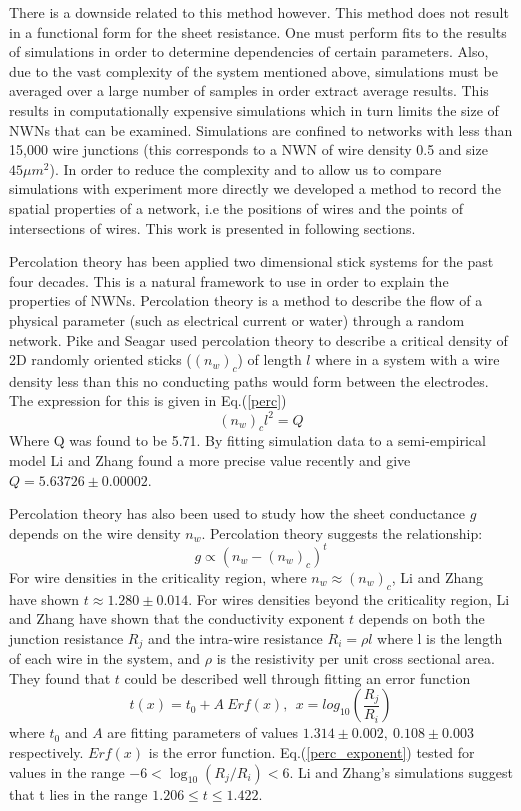 There is a downside related to this method however. This method does not result in a functional form for the sheet resistance. One must perform fits to the results of simulations in order to determine dependencies of certain parameters. Also, due to the vast complexity of the system mentioned above, simulations must be averaged over a large number of samples in order extract average results. This results in computationally expensive simulations which in turn limits the size of NWNs that can be examined. Simulations are confined to networks with less than 15,000 wire junctions (this corresponds to a NWN of wire density 0.5 and size $45 \mu m^2$). In order to reduce the complexity and to allow us to compare simulations with experiment more directly we developed a method to record the spatial properties of a network\cite{rocha2015}, i.e the positions of wires and the points of intersections of wires. This work is presented in following sections.  

Percolation theory has been applied two dimensional stick systems for the past four decades. This is a natural framework to use in order to explain the properties of NWNs. Percolation theory is a method to describe the flow of a physical parameter (such as electrical current or water) through a random network. Pike and Seagar used percolation theory to describe a critical density of 2D randomly oriented sticks ($(n_w)_c$) of length $l$ where in a system with a wire density less than this no conducting paths would form between the electrodes\cite{pike1974}. The expression for this is given in Eq.(\ref{perc})
\begin{equation}
(n_w)_c l^2 = Q
\label{perc}
\end{equation}
Where Q was found to be 5.71. By fitting simulation data to a semi-empirical model Li and Zhang found a more precise value recently and give $Q = 5.63726 \pm 0.00002$\cite{li2009}.

Percolation theory has also been used to study how the sheet conductance $g$ depends on the wire density $n_w$. Percolation theory suggests the relationship:
\begin{equation}
g \propto (n_w - (n_w)_c)^t
\end{equation}
For wire densities in the criticality region, where $n_w \approx (n_w)_c$, Li and Zhang have shown $t\approx 1.280 \pm 0.014$. For wires densities beyond the criticality region, Li and Zhang have shown that the conductivity exponent $t$ depends on both the junction resistance $R_j$ and the intra-wire resistance $R_i = \rho l$ where l is the length of each wire in the system, and $\rho$ is the resistivity per unit cross sectional area\cite{li2010}. They found that $t$ could be described well through fitting an error function
\begin{equation}
t(x) = t_0 + A~ Erf(x), ~~ x = log_{10}\left(\frac{R_j}{R_i}\right)
\label{perc_exponent}
\end{equation}
where $t_0$ and $A$ are fitting parameters of values $1.314 \pm 0.002, ~ 0.108 \pm 0.003$ respectively. $Erf(x)$ is the error function. Eq.(\ref{perc_exponent}) tested for values in the range $-6<\log_{10}(R_j/R_i)<6$. Li and Zhang's simulations suggest that t lies in the range $1.206 \leq t \leq 1.422$. 

